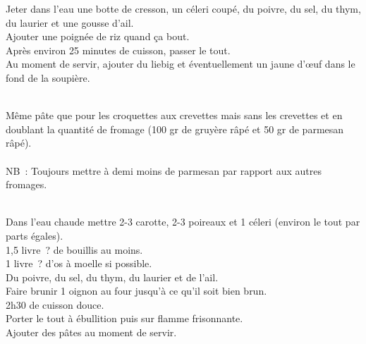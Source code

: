 \begin{minipage}[c]{\textwidth}
Jeter dans l’eau une botte de cresson, un céleri coupé, du poivre, du sel, du thym, du laurier et une gousse d’ail.\\
Ajouter une poignée de riz quand ça bout.\\
Après environ 25 minutes de cuisson, passer le tout.\\
Au moment de servir, ajouter du liebig et éventuellement un jaune d’œuf dans le fond de la soupière.\\
\\

\end{minipage}

\begin{minipage}[c]{\textwidth}
Même pâte que pour les croquettes aux crevettes mais sans les crevettes et en doublant la quantité de fromage (100 gr de gruyère râpé et 50 gr de parmesan râpé). \\
\\
NB : Toujours mettre à demi moins de parmesan par rapport aux autres fromages.\\
\\

\end{minipage}

\begin{minipage}[c]{\textwidth}
Dans l’eau chaude mettre 2-3 carotte, 2-3 poireaux et 1 céleri (environ le tout par parts égales). \\
1,5 livre ? de bouillis au moins.\\
1 livre ? d’os à moelle si possible.\\
Du poivre, du sel, du thym, du laurier et de l’ail.\\
Faire brunir 1 oignon au four jusqu’à ce qu’il soit bien brun.\\
2h30 de cuisson douce.\\
Porter le tout à ébullition puis sur flamme frisonnante.\\
Ajouter des pâtes au moment de servir.\\
\\

\end{minipage}

